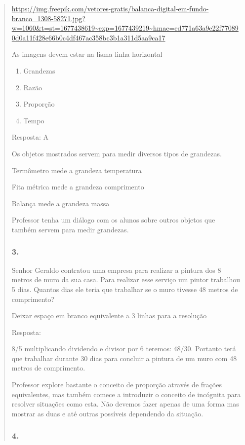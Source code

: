 \begin{enumerate}
\begin{escolha}
\begin{enumerate}
\begin{itemize}
\begin{itemize}
\begin{escolha}
\begin{quote}
\begin{escolha}
{\url{https://img.freepik.com/vetores-gratis/balanca-digital-em-fundo-branco_1308-58271.jpg?w=1060\&t=st=1677438619~exp=1677439219~hmac=ed771a63a9e22f770890d0a11f428e66b0c4df467ac358bc3b1a311d5aa9ca17}

As imagens devem estar na lisma linha horizontal

\begin{enumerate}
\def\labelenumi{\alph{enumi})}
\item
  Grandezas
\item
  Razão
\item
  Proporção
\item
  Tempo
\end{enumerate}

Resposta: A

Os objetos mostrados servem para medir diversos tipos de grandezas.

Termômetro mede a grandeza temperatura

Fita métrica mede a grandeza comprimento

Balança mede a grandeza massa

Professor tenha um diálogo com os alunos sobre outros objetos que também
servem para medir grandezas.

\subsubsection{3.}\label{section-119}

Senhor Geraldo contratou uma empresa para realizar a pintura dos 8
metros de muro da sua casa. Para realizar esse serviço um pintor
trabalhou 5 dias. Quantos dias ele teria que trabalhar se o muro tivesse
48 metros de comprimento?

Deixar espaço em branco equivalente a 3 linhas para a resolução

Resposta:

8/5 multiplicando dividendo e divisor por 6 teremos: 48/30. Portanto
terá que trabalhar durante 30 dias para concluir a pintura de um muro
com 48 metros de comprimento.

Professor explore bastante o conceito de proporção através de frações
equivalentes, mas também comece a introduzir o conceito de incógnita
para resolver situações como esta. Não devemos fazer apenas de uma forma
mas mostrar as duas e até outras possíveis dependendo da situação.

\subsubsection{4.}\label{section-120}

}
\end{escolha}
\end{quote}
\end{escolha}
\end{itemize}
\end{itemize}
\end{enumerate}
\end{escolha}
\end{enumerate}
